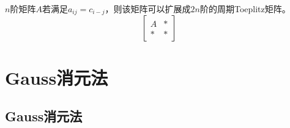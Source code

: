 \begin{remark}
    $n$阶矩阵$A$若满足$a_{ij}=c_{i-j}$，则该矩阵可以扩展成$2n$阶的周期Toeplitz矩阵。
    \[
        \begin{bmatrix}
            A&*\\ *&*
        \end{bmatrix}
    \]
\end{remark}
\fi

\section{Gauss消元法}
\label{sec:Gauss elimination}



\subsection{Gauss消元法}



